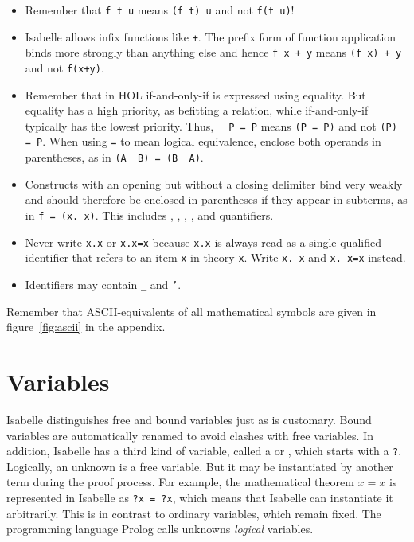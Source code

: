 \begin{itemize}
\item
Remember that \texttt{f t u} means \texttt{(f t) u} and not \texttt{f(t u)}!
\item
Isabelle allows infix functions like \texttt{+}. The prefix form of function
application binds more strongly than anything else and hence \texttt{f~x + y}
means \texttt{(f~x)~+~y} and not \texttt{f(x+y)}.
\item Remember that in HOL if-and-only-if is expressed using equality.  But
  equality has a high priority, as befitting a relation, while if-and-only-if
  typically has the lowest priority.  Thus, \texttt{\isasymnot~\isasymnot~P =
    P} means \texttt{\isasymnot\isasymnot(P = P)} and not
  \texttt{(\isasymnot\isasymnot P) = P}. When using \texttt{=} to mean
  logical equivalence, enclose both operands in parentheses, as in \texttt{(A
    \isasymand~B) = (B \isasymand~A)}.
\item
Constructs with an opening but without a closing delimiter bind very weakly
and should therefore be enclosed in parentheses if they appear in subterms, as
in \texttt{f = (\isasymlambda{}x.~x)}. This includes ,
, , \isasymlambda, and quantifiers.
\item
Never write \texttt{\isasymlambda{}x.x} or \texttt{\isasymforall{}x.x=x}
because \texttt{x.x} is always read as a single qualified identifier that
refers to an item \texttt{x} in theory \texttt{x}. Write
\texttt{\isasymlambda{}x.~x} and \texttt{\isasymforall{}x.~x=x} instead.
\item Identifiers may contain \texttt{_} and \texttt{'}.
\end{itemize}

Remember that ASCII-equivalents of all mathematical symbols are
given in figure~\ref{fig:ascii} in the appendix.

\section{Variables}
\label{sec:variables}

Isabelle distinguishes free and bound variables just as is customary. Bound
variables are automatically renamed to avoid clashes with free variables. In
addition, Isabelle has a third kind of variable, called a  or , which starts
with a \texttt{?}.  Logically, an unknown is a free variable. But it may be
instantiated by another term during the proof process. For example, the
mathematical theorem $x = x$ is represented in Isabelle as \texttt{?x = ?x},
which means that Isabelle can instantiate it arbitrarily. This is in contrast
to ordinary variables, which remain fixed. The programming language Prolog
calls unknowns {\em logical\/} variables.

